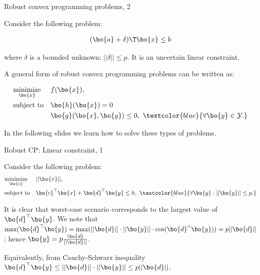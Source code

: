 \documentclass{beamer}
\begin{document}
\begin{frame}{Robust convex programming problems, 2}
	\begin{flushleft}
		
		Consider the following problem: 
		
		\begin{align}
			(\bo{a} + \delta)\T \bo{x} \leq b
		\end{align}
		
		where $\delta$ is a bounded unknown: $||\delta|| \leq p$. It is an uncertain linear constraint.
		
		\bigskip
		
		A general form of robust convex programming problems can be written as:
		
		\begin{equation}
			\begin{aligned}
				& \underset{\bo{x}}{\text{minimize}} 
				& & f(\bo{x}), \\
				& \text{subject to}
				& & \bo{h}(\bo{x}) = 0 \\
				& & & \bo{g}(\bo{x}, \bo{y}) \leq 0, \ 
				\textcolor{blue}{
					\forall \bo{y}  \in \mathcal{Y}.} 
			\end{aligned}
		\end{equation}
		
		
		\bigskip
		
		In the following slides we learn how to solve these types of problems.
		
		
	\end{flushleft}
\end{frame}





\begin{frame}{Robust CP: Linear constraint, 1}
\begin{flushleft}

Consider the following problem:
%
\begin{equation}
\begin{aligned}
& \underset{\bo{x}}{\text{minimize}} 
& & ||\bo{x}||, \\
& \text{subject to}
& & \bo{c}^\top \bo{x} + \bo{d}^\top \bo{y} \leq h, \ 
\textcolor{blue}{
 \forall \bo{y} :  ||\bo{y}|| \leq p.} 
\end{aligned}
\end{equation}

It is clear that worst-case scenario corresponds to the largest value of $\bo{d}^\top \bo{y}$. We note that $\text{max}(\bo{d}^\top \bo{y}) = \text{max}(||\bo{d}|| \cdot ||\bo{y}|| \cdot \text{cos}(\bo{d}^\wedge \bo{y})) =  p||\bo{d}||$; hence $\bo{y} =  p \frac{\bo{d}}{|| \bo{d} ||} $.

\bigskip

\textcolor{mygray}{
Equivalently, from Cauchy-Schwarz inequality $\bo{d}^\top \bo{y} \leq ||\bo{d}|| \cdot ||\bo{y}|| \leq p||\bo{d}||$.
}
 
\end{flushleft}
\end{frame}
\end{document}

